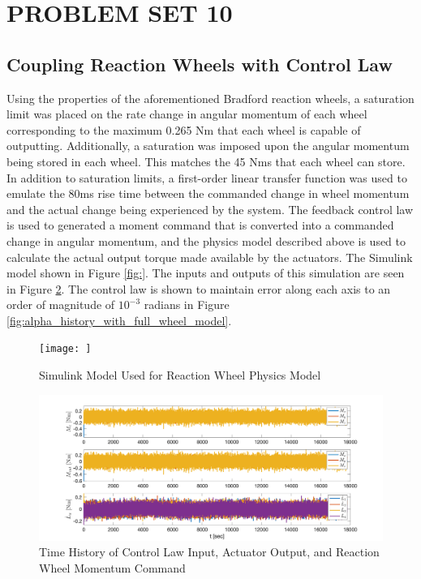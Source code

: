 \section{\Large PROBLEM SET 10}

\subsection{Coupling Reaction Wheels with Control Law}

Using the properties of the aforementioned Bradford reaction wheels, a saturation limit was placed on the rate change in angular momentum of each wheel corresponding to the maximum 0.265 Nm that each wheel is capable of outputting. Additionally, a saturation was imposed upon the angular momentum being stored in each wheel. This matches the 45 Nms that each wheel can store. In addition to saturation limits, a first-order linear transfer function was used to emulate the 80ms rise time between the commanded change in wheel momentum and the actual change being experienced by the system.
The feedback control law is used to generated a moment command that is converted into a commanded change in angular momentum, and the physics model described above is used to calculate the actual output torque made available by the actuators. The Simulink model shown in Figure \ref{fig:}. The inputs and outputs of this simulation are seen in Figure \ref{fig:reaction_wheel_outputs}. The control law is shown to maintain error along each axis to an order of magnitude of $10^{-3}$ radians in Figure \ref{fig:alpha_history_with_full_wheel_model}.

\begin{figure}[H]
    \centering
    \captionsetup{ justification = centering }
    \texttt{[image: ]}
    \caption{Simulink Model Used for Reaction Wheel Physics Model}
    \label{fig:enter-label}
\end{figure}

\begin{figure}[H]
    \centering
    \captionsetup{ justification = centering}
    \includegraphics[width=15cm]{Images/PS10/reaction_wheel_model_output.png}
    \caption{Time History of Control Law Input, Actuator Output, and Reaction Wheel Momentum Command}
    \label{fig:reaction_wheel_outputs}
\end{figure}

